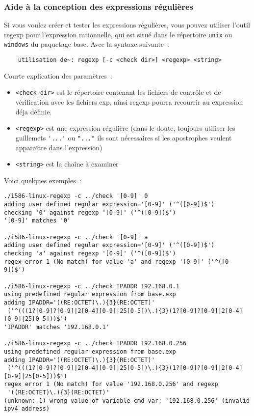 \subsubsection{Aide à la conception des expressions régulières}

Si vous voulez créer et tester les expressions régulières, vous pouvez
utiliser l'outil regexp pour l'expression rationnelle,
qui est situé dans le répertoire \texttt{unix}
ou \texttt{windows} du paquetage \og{}base\fg{}.
Avec la syntaxe suivante~:

\begin{example}
\begin{verbatim}
    utilisation de~: regexp [-c <check dir>] <regexp> <string>
\end{verbatim}
\end{example}

Courte explication des paramètres~:

\begin{itemize}
\item \texttt{<check dir>} est le répertoire contenant les fichiers de contrôle et
de vérification avec les fichiers exp, ainsi \og{}regexp\fg{} pourra recourrir au
expression déja définie.

\item \texttt{<regexp>} est une expression régulière (dans le doute, toujours
utiliser les guillemets \verb+'...'+ ou \verb+"..."+ ils sont nécessaires
si les apostrophes veulent apparaître dans l'expression)

\item \texttt{<string>} est la chaîne à examiner
\end{itemize}

Voici quelques exemples~:
\begin{example}
\begin{verbatim}
./i586-linux-regexp -c ../check '[0-9]' 0
adding user defined regular expression='[0-9]' ('^([0-9])$')
checking '0' against regexp '[0-9]' ('^([0-9])$')
'[0-9]' matches '0'

./i586-linux-regexp -c ../check '[0-9]' a
adding user defined regular expression='[0-9]' ('^([0-9])$')
checking 'a' against regexp '[0-9]' ('^([0-9])$')
regex error 1 (No match) for value 'a' and regexp '[0-9]' ('^([0-9])$')

./i586-linux-regexp -c ../check IPADDR 192.168.0.1
using predefined regular expression from base.exp
adding IPADDR='((RE:OCTET)\.){3}(RE:OCTET)'
 ('^(((1?[0-9]?[0-9]|2[0-4][0-9]|25[0-5])\.){3}(1?[0-9]?[0-9]|2[0-4][0-9]|25[0-5]))$')
'IPADDR' matches '192.168.0.1'

./i586-linux-regexp -c ../check IPADDR 192.168.0.256
using predefined regular expression from base.exp
adding IPADDR='((RE:OCTET)\.){3}(RE:OCTET)'
 ('^(((1?[0-9]?[0-9]|2[0-4][0-9]|25[0-5])\.){3}(1?[0-9]?[0-9]|2[0-4][0-9]|25[0-5]))$')
regex error 1 (No match) for value '192.168.0.256' and regexp
 '((RE:OCTET)\.){3}(RE:OCTET)'
(unknown:-1) wrong value of variable cmd_var: '192.168.0.256' (invalid ipv4 address)
\end{verbatim}
\end{example}


